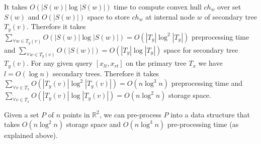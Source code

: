 \documentclass[runningheads,a4paper]{llncs}
\begin{document}
It takes $O(|S(w)|\log |S(w)|)$ time to compute convex hull $ch_{w}$ over set
$S(w)$ and $O(|S(w)|)$ space to store $ch_{w}$ at internal node $w$ of
secondary tree $T_{y}(v)$. Therefore it takes
$\displaystyle\sum\limits_{\forall w \in T_{y}(v)}O(|S(w)| \log |S(w)|) =
O(|T_{y}| \log^{2}|T_{y}|)$ preprocessing time and
$\displaystyle\sum\limits_{\forall w \in T_{y}(v)}O(|S(w)|) = O(|T_{y}|
\log|T_{y}|)$ space for secondary tree $T_{y}(v)$. For any given query
$[x_{lt}, x_{rt}]$ on the primary tree $T_{x}$ we have $l=O(\log n)$ secondary
trees. Therefore it takes $\displaystyle\sum\limits_{\forall v \in
  T_{x}}O(|T_{y}(v)| \log^{2}|T_{y}(v)|) = O(n \log^{3 }n)$ preprocessing time
and $\displaystyle\sum\limits_{\forall v \in T_{x}}O(|T_{y}(v)|
\log|T_{y}(v)|) = O(n \log^{2} n)$ storage space.

\begin{lemma}\label{lem1}
  Given a set $P$ of $n$ points in $\mathbb{R}^{2}$, we can pre-process $P$
  into a data structure that takes $O(n \log^{2} n)$ storage space and $O(n
  \log^{3} n)$ pre-processing time (as explained above).
\end{lemma}
\end{document}
